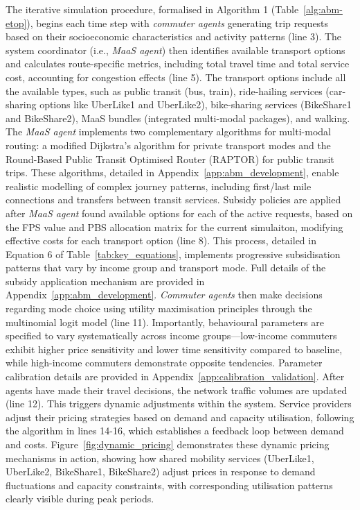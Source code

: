 \documentclass[a4paper,fleqn]{cas-sc}
\begin{document}
The iterative simulation procedure, formalised in Algorithm 1 (Table~\ref{alg:abm-etop}), begins each time step with \textit{commuter agents} generating trip requests based on their socioeconomic characteristics and activity patterns (line 3). The system coordinator (i.e., \textit{MaaS agent}) then identifies available transport options and calculates route-specific metrics, including total travel time and total service cost, accounting for congestion effects (line 5). The transport options include all the available types, such as public transit (bus, train), ride-hailing services (car-sharing options like UberLike1 and UberLike2), bike-sharing services (BikeShare1 and BikeShare2), MaaS bundles (integrated multi-modal packages), and walking. The \textit{MaaS agent} implements two complementary algorithms for multi-modal routing: a modified Dijkstra's algorithm for private transport modes and the Round-Based Public Transit Optimised Router (RAPTOR) for public transit trips. These algorithms, detailed in Appendix~\ref{app:abm_development}, enable realistic modelling of complex journey patterns, including first/last mile connections and transfers between transit services. Subsidy policies are applied after \textit{MaaS agent} found available options for each of the active requests, based on the FPS value and PBS allocation matrix for the current simulaiton, modifying effective costs for each transport option (line 8). This process, detailed in Equation 6 of Table~\ref{tab:key_equations}, implements progressive subsidisation patterns that vary by income group and transport mode. Full details of the subsidy application mechanism are provided in Appendix~\ref{app:abm_development}. \textit{Commuter agents} then make decisions regarding mode choice using utility maximisation principles through the multinomial logit model (line 11). Importantly, behavioural parameters are specified to vary systematically across income groups—low-income commuters exhibit higher price sensitivity and lower time sensitivity compared to baseline, while high-income commuters demonstrate opposite tendencies. Parameter calibration details are provided in Appendix~\ref{app:calibration_validation}. After agents have made their travel decisions, the network traffic volumes are updated (line 12). This triggers dynamic adjustments within the system. Service providers adjust their pricing strategies based on demand and capacity utilisation, following the algorithm in lines 14-16, which establishes a feedback loop between demand and costs. Figure~\ref{fig:dynamic_pricing} demonstrates these dynamic pricing mechanisms in action, showing how shared mobility services (UberLike1, UberLike2, BikeShare1, BikeShare2) adjust prices in response to demand fluctuations and capacity constraints, with corresponding utilisation patterns clearly visible during peak periods. 
\end{document}
